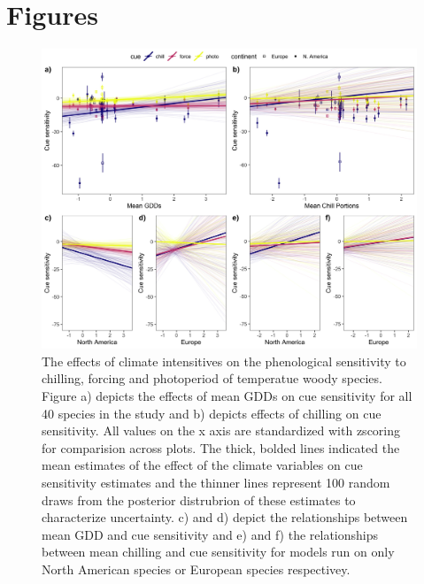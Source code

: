 \documentclass[12pt]{article}\usepackage[]{graphicx}\usepackage[]{color}
\begin{document}
\section*{Figures}

\begin{figure}[h!]
    \centering
 \includegraphics[width=\textwidth]{..//..//analyses/ranges/figures/mock2.jpeg} 
    \caption{The effects of climate intensitives on the phenological sensitivity to chilling, forcing and photoperiod of temperatue woody species. Figure a) depicts the effects of mean GDDs on cue sensitivity for all 40 species in the study and b) depicts effects of chilling on cue sensitivity. All values on the x axis are standardized with zscoring for comparision across plots. The thick, bolded lines indicated the mean estimates of the effect of the climate variables on cue sensitivity estimates and the thinner lines represent 100 random draws from the posterior distrubrion of these estimates to characterize uncertainty. c) and d) depict the relationships between mean GDD and cue sensitivity and e) and f) the relationships between mean chilling and cue sensitivity for models run on only North American species or European species respectivey. }
    \label{fig:mods1}
\end{figure}
\end{document}
